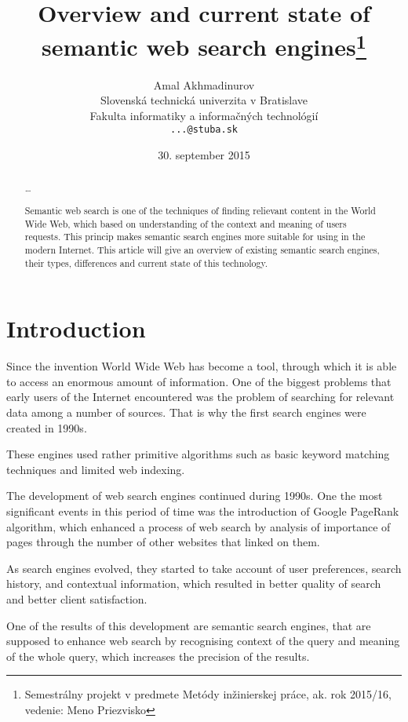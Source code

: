 \documentclass[10pt,twoside,a4paper]{article}
\title{Overview and current state of semantic web search engines\thanks{Semestrálny projekt v predmete Metódy inžinierskej práce, ak. rok 2015/16, vedenie: Meno Priezvisko}} %
\author{Amal Akhmadinurov\\[2pt]
	{\small Slovenská technická univerzita v Bratislave}\\
	{\small Fakulta informatiky a informačných technológií}\\
	{\small \texttt{...@stuba.sk}}
	}
\date{\small 30. september 2015} %
\begin{document}
\maketitle

\begin{abstract}
\ldots

Semantic web search is one of the techniques of finding relievant content in the World Wide Web,  which based on understanding of the context and meaning of users requests.  This princip makes semantic search engines more suitable for using in the modern Internet.  This article will give an overview of existing semantic search engines,  their types, differences  and  current state of this technology.

\end{abstract}
\section{Introduction}

Since the invention World Wide Web has become a tool,  through which  it is able to access an enormous amount of information.  One of the biggest problems that early users of the Internet encountered was the problem of  searching for relevant data among a number of sources.  That is why the first search engines were created in 1990s. 


These engines used rather primitive algorithms such as basic keyword matching techniques and limited web indexing. \cite{efe}

The development of web search engines continued during 1990s. One the most significant events in this period of time was the introduction of Google PageRank algorithm, which enhanced a process of web search by analysis of importance of pages through the number of other websites that linked on them.\cite{hist} \cite{efe}

As search engines evolved, they started to take account of user preferences, search history, and contextual information, which resulted in better quality of search and better client satisfaction.\cite{efe}

One of the results of this development are semantic search engines, that are supposed to enhance web search by  recognising context of the query and meaning of the whole query, which increases the precision of the results.\cite{intr}
\end{document}
